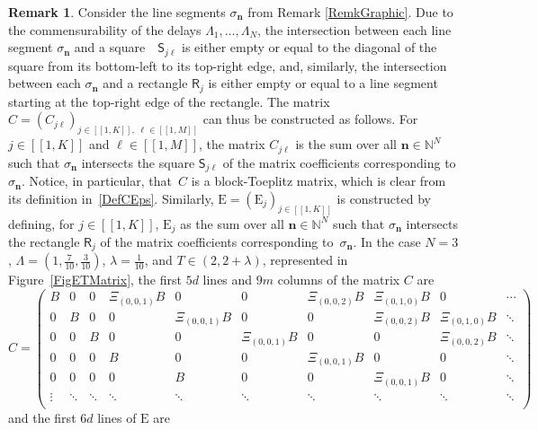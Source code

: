 \documentclass[10pt]{amsart}
\newcommand{\bn}{\boldsymbol{n}}
\newcommand{\llbracket}{[\![}
\newcommand{\rrbracket}{]\!]}
\theoremstyle{plain}
\theoremstyle{definition}
\newtheorem{remk}[theo]{Remark}
\newcommand{\Epsilon}{\mathrm E}
\begin{document}
\begin{remk}
Consider the line segments $\sigma_{\bn}$ from Remark \ref{RemkGraphic}. Due to the commensurability of the delays $\Lambda_1, \dots, \Lambda_N$, the intersection between each line segment $\sigma_{\bn}$ and a square~ $\mathsf S_{j\ell}$ is either empty or equal to the diagonal of the square from its bottom-left to its top-right edge, and, similarly, the intersection between each $\sigma_{\bn}$ and a rectangle $\mathsf R_j$ is either empty or equal to a line segment starting at the top-right edge of the rectangle. The matrix $C = \left(C_{j\ell}\right)_{j \in \llbracket 1, K\rrbracket,\; \ell \in \llbracket 1, M\rrbracket}$ can thus be constructed as follows. For \hbox{$j \in \llbracket 1, K\rrbracket$} and $\ell \in \llbracket 1, M\rrbracket$, the matrix $C_{j\ell}$ is the sum over all $\bn \in \mathbb N^N$ such that $\sigma_{\bn}$ intersects the square $\mathsf S_{j\ell}$ of the matrix coefficients corresponding to $\sigma_{\bn}$. Notice, in particular, that~$C$ is a block-Toeplitz matrix, which is clear from its definition in~\eqref{DefCEps}. Similarly, $\Epsilon = \left(\Epsilon_j\right)_{j \in \llbracket 1, K\rrbracket}$ is constructed by defining, for $j \in \llbracket 1, K\rrbracket$, $\Epsilon_j$ as the sum over all \hbox{$\bn \in \mathbb N^N$} such that $\sigma_{\bn}$ intersects the rectangle $\mathsf R_{j}$ of the matrix coefficients corresponding to~$\sigma_{\bn}$. In the case $N = 3$, $\Lambda = \left(1, \frac{7}{10}, \frac{3}{10}\right)$, $\lambda = \frac{1}{10}$, and $T \in (2, 2 + \lambda)$, represented in Figure~\ref{FigETMatrix}, the first $5d$ lines and $9m$ columns of the matrix $C$ are
\begin{equation*}
C =
\begin{pmatrix}
B & 0 & 0 & \Xi_{(0, 0, 1)} B & 0 & 0 & \Xi_{(0, 0, 2)} B & \Xi_{(0, 1, 0)} B & 0 & \cdots \\
0 & B & 0 & 0 & \Xi_{(0, 0, 1)} B & 0 & 0 & \Xi_{(0, 0, 2)} B & \Xi_{(0, 1, 0)} B & \ddots \\
0 & 0 & B & 0 & 0 & \Xi_{(0, 0, 1)} B & 0 & 0 & \Xi_{(0, 0, 2)} B & \ddots \\
0 & 0 & 0 & B & 0 & 0 & \Xi_{(0, 0, 1)} B & 0 & 0 & \ddots \\
0 & 0 & 0 & 0 & B & 0 & 0 & \Xi_{(0, 0, 1)} B & 0 & \ddots \\
\vdots & \ddots & \ddots & \ddots & \ddots & \ddots & \ddots & \ddots & \ddots & \ddots \\
\end{pmatrix}
\end{equation*}
and the first $6d$ lines of $\Epsilon$ are

\end{remk}
\end{document}
